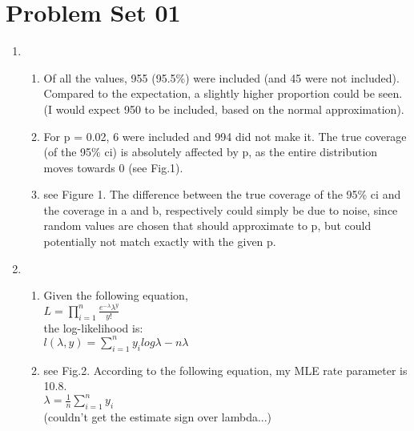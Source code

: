 \documentclass[letterpaper, 12pt]{article}
\begin{document}
\section*{Problem Set 01}

\begin{enumerate}

	\item %

	\begin{enumerate}
		\item Of all the values, 955 (95.5\%) were included (and 45 were not included). Compared to the expectation, a slightly higher proportion could be seen. (I would expect 950 to be included, based on the normal approximation).
		\item For p = 0.02, 6 were included and 994 did not make it. The true coverage (of the 95\% ci) is absolutely affected by p, as the entire distribution moves towards 0 (see Fig.1).
		\item see Figure 1. The difference between the true coverage of the 95\% ci and the coverage in a and b, respectively could simply be due to noise, since random values are chosen that should approximate to p, but could potentially not match exactly with the given p.

	\end{enumerate}

	\item %
	\begin{enumerate}

		\item Given the following equation, \\$L = \prod\limits_{i=1}^{n} \frac{{e^{ - \lambda } \lambda ^y }}{{y!}}$  \\
		the log-likelihood is: \\
	
		$l(\lambda, y) = \sum\limits_{i=1}^{n} y_{i} log\lambda - n\lambda$
		


		\item see Fig.2. According to the following equation, my MLE rate parameter is 10.8. \\
		$ \lambda = \frac{1}{n} \sum\limits_{i=1}^{n} y_{i}$ \\
		{\small(couldn't get the estimate sign over lambda...)}


\end{enumerate}
\end{enumerate}
\end{document}
